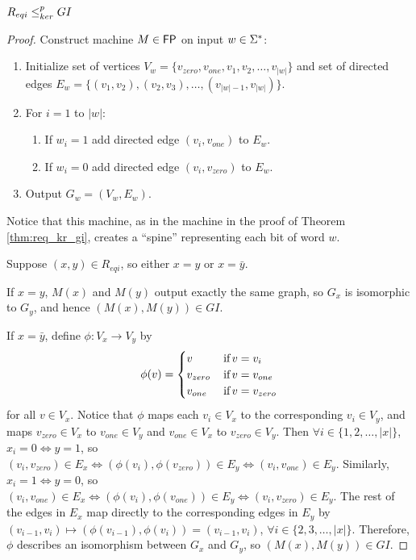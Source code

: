 \begin{theorem}$R_{eqi}\leq^{p}_{ker} GI$\end{theorem}
\begin{proof}
  Construct machine $M\in {\ensuremath{\mathsf{FP}}}$ on input $w\in\Sigma^{*}$:
  \begin{enumerate}
  \item Initialize set of vertices $V_w=\{v_{zero}, v_{one}, v_1, v_2, \ldots,
    v_{|w|}\}$ and set of directed edges $E_w=\{(v_1, v_2), (v_2, v_3), \ldots,
    (v_{|w|-1}, v_{|w|})\}$.
  \item For $i=1$ to $|w|$:
    \begin{enumerate}
    \item If $w_i=1$ add directed edge $(v_i, v_{one})$ to $E_w$.
    \item If $w_i=0$ add directed edge $(v_i, v_{zero})$ to $E_w$.
    \end{enumerate}
  \item Output $G_w=(V_w, E_w)$.
  \end{enumerate}
  Notice that this machine, as in the machine in the proof of Theorem
  \ref{thm:req_kr_gi}, creates a ``spine'' representing each bit of word
  $w$.

  Suppose $(x, y)\in R_{eqi}$, so either $x=y$ or $x=\bar{y}$.

  If $x=y$, $M(x)$ and $M(y)$ output exactly the same graph, so $G_x$ is
  isomorphic to $G_y$, and hence $(M(x), M(y))\in GI$.

  If $x=\bar{y}$, define $\phi:V_x\to V_y$ by
  \begin{displaymath}
    \phi(v)=
    \begin{cases}
      v & \,\text{if}\, v = v_i\\
      v_{zero} & \,\text{if}\, v = v_{one}\\
      v_{one} & \,\text{if}\, v = v_{zero}
    \end{cases}
  \end{displaymath}
  for all $v\in V_x$. Notice that $\phi$ maps each $v_i\in V_x$ to the
  corresponding $v_i\in V_y$, and maps $v_{zero}\in V_x$ to $v_{one}\in V_y$
  and $v_{one}\in V_x$ to $v_{zero}\in V_y$. Then $\forall
  i\in\{1,2,\ldots,|x|\}$, $x_i=0 \iff y=1$, so $(v_i, v_{zero})\in E_x \iff
  (\phi(v_i), \phi(v_{zero}))\in E_y \iff (v_i, v_{one})\in E_y$. Similarly,
  $x_i=1 \iff y=0$, so $(v_i, v_{one})\in E_x \iff (\phi(v_i),
  \phi(v_{one}))\in E_y \iff (v_i, v_{zero})\in E_y$. The rest of the edges in
  $E_x$ map directly to the corresponding edges in $E_y$ by $(v_{i-1}, v_i)
  \mapsto (\phi(v_{i-1}), \phi(v_i))=(v_{i-1}, v_i)$, $\forall
  i\in\{2,3,\ldots,|x|\}$. Therefore, $\phi$ describes an isomorphism between
  $G_x$ and $G_y$, so $(M(x), M(y))\in GI$.


\end{proof}
